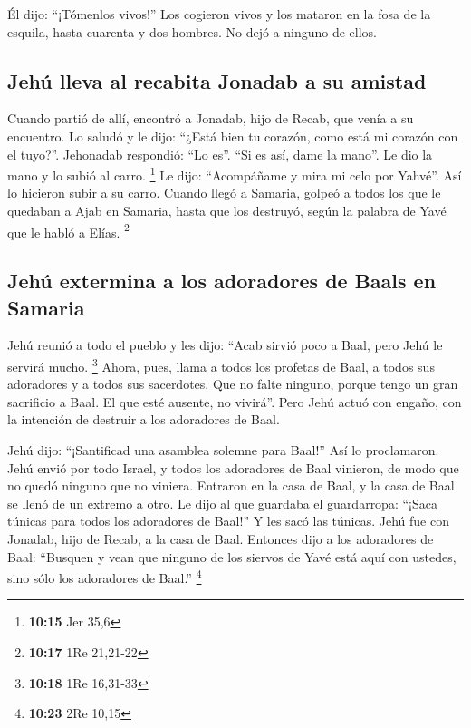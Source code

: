 \begin{paracol}{2}
 Él dijo: ``¡Tómenlos vivos!'' Los cogieron vivos y los
mataron en la fosa de la esquila, hasta cuarenta y dos hombres. No dejó
a ninguno de ellos.

\hypertarget{jehuxfa-lleva-al-recabita-jonadab-a-su-amistad}{%
\subsection{Jehú lleva al recabita Jonadab a su
amistad}\label{jehuxfa-lleva-al-recabita-jonadab-a-su-amistad}}

 Cuando partió de allí, encontró a Jonadab, hijo de
Recab, que venía a su encuentro. Lo saludó y le dijo: ``¿Está bien tu
corazón, como está mi corazón con el tuyo?''. Jehonadab respondió: ``Lo
es''. ``Si es así, dame la mano''. Le dio la mano y lo subió al carro.
\footnote{\textbf{10:15} Jer 35,6}  Le dijo: ``Acompáñame
y mira mi celo por Yahvé''. Así lo hicieron subir a su carro.
 Cuando llegó a Samaria, golpeó a todos los que le
quedaban a Ajab en Samaria, hasta que los destruyó, según la palabra de
Yavé que le habló a Elías. \footnote{\textbf{10:17} 1Re 21,21-22}

\hypertarget{jehuxfa-extermina-a-los-adoradores-de-baals-en-samaria}{%
\subsection{Jehú extermina a los adoradores de Baals en
Samaria}\label{jehuxfa-extermina-a-los-adoradores-de-baals-en-samaria}}

 Jehú reunió a todo el pueblo y les dijo: ``Acab sirvió
poco a Baal, pero Jehú le servirá mucho. \footnote{\textbf{10:18} 1Re
  16,31-33}  Ahora, pues, llama a todos los profetas de
Baal, a todos sus adoradores y a todos sus sacerdotes. Que no falte
ninguno, porque tengo un gran sacrificio a Baal. El que esté ausente, no
vivirá''. Pero Jehú actuó con engaño, con la intención de destruir a los
adoradores de Baal.

 Jehú dijo: ``¡Santificad una asamblea solemne para
Baal!'' Así lo proclamaron.  Jehú envió por todo Israel,
y todos los adoradores de Baal vinieron, de modo que no quedó ninguno
que no viniera. Entraron en la casa de Baal, y la casa de Baal se llenó
de un extremo a otro.  Le dijo al que guardaba el
guardarropa: ``¡Saca túnicas para todos los adoradores de Baal!'' Y les
sacó las túnicas.  Jehú fue con Jonadab, hijo de Recab, a
la casa de Baal. Entonces dijo a los adoradores de Baal: ``Busquen y
vean que ninguno de los siervos de Yavé está aquí con ustedes, sino sólo
los adoradores de Baal.'' \footnote{\textbf{10:23} 2Re 10,15}


\end{paracol}
